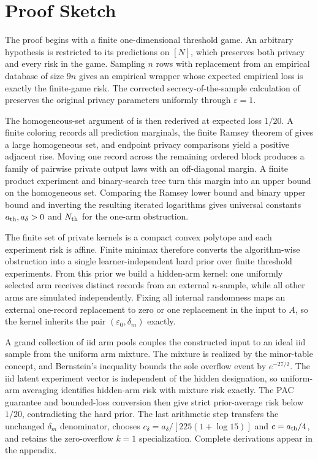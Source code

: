\section{Proof Sketch}
\label{sec:proof-sketch}

The proof begins with a finite one-dimensional threshold game.  An arbitrary
hypothesis is restricted to its predictions on $[N]$, which preserves both
privacy and every risk in the game.  Sampling $n$ rows with replacement from
an empirical database of size $9n$ gives an empirical wrapper whose expected
empirical loss is exactly the finite-game risk.  The corrected
secrecy-of-the-sample calculation of \citet{bunEtAl2015thresholds} preserves
the original privacy parameters uniformly through $\varepsilon=1$.

The homogeneous-set argument of \citet{alonEtAl2018private} is then
rederived at expected loss $1/20$.  A finite coloring records all prediction
marginals, the finite Ramsey theorem of \citet{erdosRado1952} gives a large
homogeneous set, and endpoint privacy comparisons yield a positive adjacent
rise.  Moving one record across the remaining ordered block produces a family
of pairwise private output laws with an off-diagonal margin.  A finite product
experiment and binary-search tree turn this margin into an upper bound on the
homogeneous set.  Comparing the Ramsey lower bound and binary upper bound and
inverting the resulting iterated logarithms gives universal constants
$a_{\rm th},a_\delta>0$ and $N_{\rm th}$ for the one-arm obstruction.

The finite set of private kernels is a compact convex polytope and each
experiment risk is affine.  Finite minimax therefore converts the
algorithm-wise obstruction into a single learner-independent hard prior over
finite threshold experiments.  From this prior we build a hidden-arm kernel:
one uniformly selected arm receives distinct records from an external
$n$-sample, while all other arms are simulated independently.  Fixing all
internal randomness maps an external one-record replacement to zero or one
replacement in the input to $A$, so the kernel inherits the pair
$(\varepsilon_0,\delta_m)$ exactly.

A grand collection of iid arm pools couples the constructed input to an ideal
iid sample from the uniform arm mixture.  The mixture is realized by the
minor-table concept, and Bernstein's inequality bounds the sole overflow
event by $e^{-27/2}$.  The iid latent experiment vector is independent of the
hidden designation, so uniform-arm averaging identifies hidden-arm risk with
mixture risk exactly.  The PAC guarantee and bounded-loss conversion then give
strict prior-average risk below $1/20$, contradicting the hard prior.  The
last arithmetic step transfers the unchanged $\delta_m$ denominator, chooses
$c_\delta=a_\delta/[225(1+\log15)]$ and $c=a_{\rm th}/4$, and retains the
zero-overflow $k=1$ specialization.  Complete derivations appear in the
appendix.
